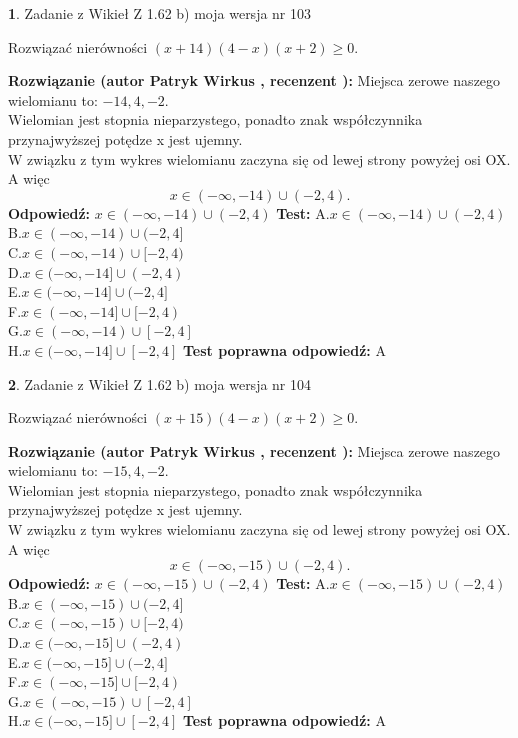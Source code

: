 \documentclass[12pt, a4paper]{article}
\theoremstyle{definition} %
\newtheorem{zad}{}
\newcommand{\zadStart}[1]{\begin{zad}#1\newline}
\newcommand{\zadStop}{\end{zad}}
\newcommand{\rozwStart}[2]{\noindent \textbf{Rozwiązanie (autor #1 , recenzent #2): }\newline}
\newcommand{\rozwStop}{\newline}
\newcommand{\odpStart}{\noindent \textbf{Odpowiedź:}\newline}
\newcommand{\odpStop}{\newline}
\newcommand{\testStart}{\noindent \textbf{Test:}\newline}
\newcommand{\testStop}{\newline}
\newcommand{\kluczStart}{\noindent \textbf{Test poprawna odpowiedź:}\newline}
\newcommand{\kluczStop}{\newline}
\begin{document}
\zadStart{Zadanie z Wikieł Z 1.62 b) moja wersja nr 103}

Rozwiązać nierówności $(x+14)(4-x)(x+2)\ge0$.
\zadStop
\rozwStart{Patryk Wirkus}{}
Miejsca zerowe naszego wielomianu to: $-14, 4, -2$.\\
Wielomian jest stopnia nieparzystego, ponadto znak współczynnika przy\linebreak najwyższej potędze x jest ujemny.\\ W związku z tym wykres wielomianu zaczyna się od lewej strony powyżej osi OX. A więc $$x \in (-\infty,-14) \cup (-2,4).$$
\rozwStop
\odpStart
$x \in (-\infty,-14) \cup (-2,4)$
\odpStop
\testStart
A.$x \in (-\infty,-14) \cup (-2,4)$\\
B.$x \in (-\infty,-14) \cup (-2,4]$\\
C.$x \in (-\infty,-14) \cup [-2,4)$\\
D.$x \in (-\infty,-14] \cup (-2,4)$\\
E.$x \in (-\infty,-14] \cup (-2,4]$\\
F.$x \in (-\infty,-14] \cup [-2,4)$\\
G.$x \in (-\infty,-14) \cup [-2,4]$\\
H.$x \in (-\infty,-14] \cup [-2,4]$
\testStop
\kluczStart
A
\kluczStop



\zadStart{Zadanie z Wikieł Z 1.62 b) moja wersja nr 104}

Rozwiązać nierówności $(x+15)(4-x)(x+2)\ge0$.
\zadStop
\rozwStart{Patryk Wirkus}{}
Miejsca zerowe naszego wielomianu to: $-15, 4, -2$.\\
Wielomian jest stopnia nieparzystego, ponadto znak współczynnika przy\linebreak najwyższej potędze x jest ujemny.\\ W związku z tym wykres wielomianu zaczyna się od lewej strony powyżej osi OX. A więc $$x \in (-\infty,-15) \cup (-2,4).$$
\rozwStop
\odpStart
$x \in (-\infty,-15) \cup (-2,4)$
\odpStop
\testStart
A.$x \in (-\infty,-15) \cup (-2,4)$\\
B.$x \in (-\infty,-15) \cup (-2,4]$\\
C.$x \in (-\infty,-15) \cup [-2,4)$\\
D.$x \in (-\infty,-15] \cup (-2,4)$\\
E.$x \in (-\infty,-15] \cup (-2,4]$\\
F.$x \in (-\infty,-15] \cup [-2,4)$\\
G.$x \in (-\infty,-15) \cup [-2,4]$\\
H.$x \in (-\infty,-15] \cup [-2,4]$
\testStop
\kluczStart
A
\kluczStop
\end{document}
